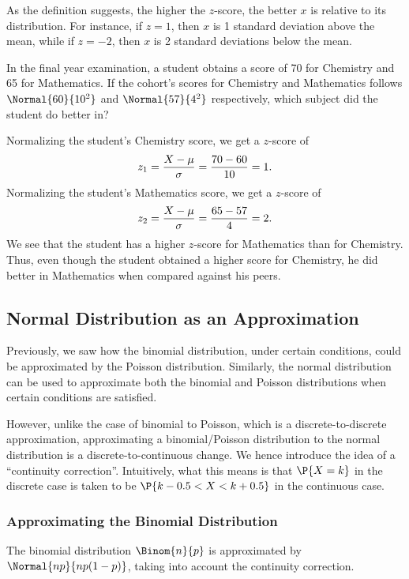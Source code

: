 As the definition suggests, the higher the $z$-score, the better $x$ is relative to its distribution. For instance, if $z = 1$, then $x$ is 1 standard deviation above the mean, while if $z = -2$, then $x$ is 2 standard deviations below the mean.

\begin{sample}
    In the final year examination, a student obtains a score of 70 for Chemistry and 65 for Mathematics. If the cohort's scores for Chemistry and Mathematics follows $\Normal{60}{10^2}$ and $\Normal{57}{4^2}$ respectively, which subject did the student do better in?
\end{sample}
\begin{sampans}
    Normalizing the student's Chemistry score, we get a $z$-score of \[z_1 = \frac{X - \mu}{\sigma} = \frac{70 - 60}{10} = 1.\] Normalizing the student's Mathematics score, we get a $z$-score of \[z_2 = \frac{X - \mu}{\sigma} = \frac{65 - 57}{4} = 2.\] We see that the student has a higher $z$-score for Mathematics than for Chemistry. Thus, even though the student obtained a higher score for Chemistry, he did better in Mathematics when compared against his peers.
\end{sampans}

\subsection{Normal Distribution as an Approximation}

Previously, we saw how the binomial distribution, under certain conditions, could be approximated by the Poisson distribution. Similarly, the normal distribution can be used to approximate both the binomial and Poisson distributions when certain conditions are satisfied.

However, unlike the case of binomial to Poisson, which is a discrete-to-discrete approximation, approximating a binomial/Poisson distribution to the normal distribution is a discrete-to-continuous change. We hence introduce the idea of a ``continuity correction''. Intuitively, what this means is that $\P{X = k}$ in the discrete case is taken to be $\P{k-0.5 < X < k + 0.5}$ in the continuous case.

\subsubsection{Approximating the Binomial Distribution}

\begin{proposition}
    The binomial distribution $\Binom{n}{p}$ is approximated by $\Normal{np}{np(1-p)}$, taking into account the continuity correction.
\end{proposition}

